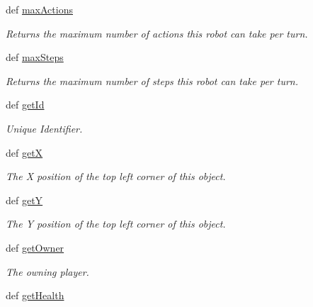 \begin{DoxyCompactItemize}
def \hyperlink{classGameObject_1_1Bot_ac926e9da58f96ee5996d22e609d1a41e}{maxActions}
\begin{DoxyCompactList}\small\item\em Returns the maximum number of actions this robot can take per turn. \item\end{DoxyCompactList}\item 
def \hyperlink{classGameObject_1_1Bot_ab2f7439ed0465837575635fadcd04e48}{maxSteps}
\begin{DoxyCompactList}\small\item\em Returns the maximum number of steps this robot can take per turn. \item\end{DoxyCompactList}\item 
\hypertarget{classGameObject_1_1Bot_ae315ea2bbf2580ad9472142793e33603}{
def \hyperlink{classGameObject_1_1Bot_ae315ea2bbf2580ad9472142793e33603}{getId}}
\label{classGameObject_1_1Bot_ae315ea2bbf2580ad9472142793e33603}

\begin{DoxyCompactList}\small\item\em Unique Identifier. \item\end{DoxyCompactList}\item 
def \hyperlink{classGameObject_1_1Bot_a76521d97d7dcce093efbdd1926c75750}{getX}
\begin{DoxyCompactList}\small\item\em The X position of the top left corner of this object. \item\end{DoxyCompactList}\item 
def \hyperlink{classGameObject_1_1Bot_a5e193704cae24529a6e6f00fd9a1447f}{getY}
\begin{DoxyCompactList}\small\item\em The Y position of the top left corner of this object. \item\end{DoxyCompactList}\item 
\hypertarget{classGameObject_1_1Bot_aac97597e773e01e0bc9097b72348da29}{
def \hyperlink{classGameObject_1_1Bot_aac97597e773e01e0bc9097b72348da29}{getOwner}}
\label{classGameObject_1_1Bot_aac97597e773e01e0bc9097b72348da29}

\begin{DoxyCompactList}\small\item\em The owning player. \item\end{DoxyCompactList}\item 
\hypertarget{classGameObject_1_1Bot_a3009ec43cd1c14fd1bc1c3acd278d8a0}{
def \hyperlink{classGameObject_1_1Bot_a3009ec43cd1c14fd1bc1c3acd278d8a0}{getHealth}}
\label{classGameObject_1_1Bot_a3009ec43cd1c14fd1bc1c3acd278d8a0}


\end{DoxyCompactItemize}
